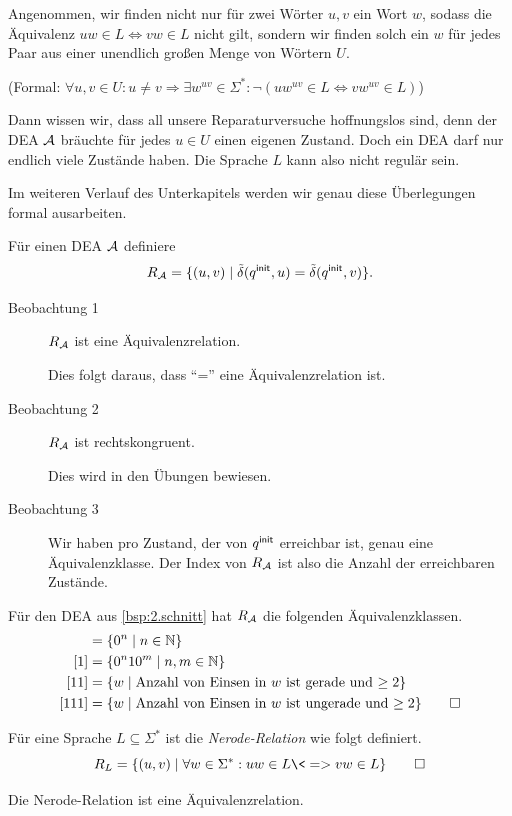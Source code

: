 Angenommen, wir finden nicht nur für zwei Wörter $u,v$ ein Wort $w$, sodass die Äquivalenz $uw\in L \Leftrightarrow vw\in L$ nicht gilt,
sondern wir finden solch ein $w$ für jedes Paar aus einer unendlich großen Menge von Wörtern $U$.
\begin{center}
(Formal: $\forall u,v\in U: u\neq v \Rightarrow \exists w^{uv}\in\Sigma^*: \neg(uw^{uv}\in L \Leftrightarrow vw^{uv}\in L)$) 
\end{center}
Dann wissen wir, dass all unsere Reparaturversuche hoffnungslos sind,
denn der \ac{DEA} $\mathcal{A}$ bräuchte für jedes $u\in U$ einen eigenen Zustand.
Doch ein \ac{DEA} darf nur endlich viele Zustände haben.
Die Sprache $L$ kann also nicht regulär sein.

Im weiteren Verlauf des Unterkapitels werden wir genau diese Überlegungen formal ausarbeiten.


\begin{Def} %
  \label{Bsp:R_m}
        Für einen \ac{DEA} $\mathcal{A}$ definiere
        \[ R_{\mathcal{A}} = \{(u,v) \mid \tilde\delta(q^\mathsf{init},u)=\tilde\delta(q^\mathsf{init},v)\}. \]
        \begin{description}
                \item[Beobachtung 1] $R_{\mathcal{A}}$ ist eine Äquivalenzrelation.
                
                Dies folgt daraus, dass "`="' eine Äquivalenzrelation ist.
                \item[Beobachtung 2] $R_{\mathcal{A}}$ ist rechtskongruent. 
                
                Dies wird in den Übungen bewiesen.
                \item[Beobachtung 3] Wir haben pro Zustand, der von $q^\mathsf{init}$ erreichbar ist, genau eine Äquivalenzklasse.
                Der Index von $R_{\mathcal{A}}$ ist also die Anzahl der erreichbaren Zustände.
        \end{description}
        
        \medskip
        
        Für den \ac{DEA} aus \autoref{bsp:2.schnitt} hat $R_{\mathcal{A}}$ die folgenden Äquivalenzklassen.
        \begin{align*}
        [\Eps] &= \{0^n\mid n\in \N\}\\
        [1] &= \{0^n10^m\mid n,m\in \N\}\\
        [11] &= \{w\mid \text{Anzahl von Einsen in $w$ ist gerade und $\geq 2$}\}\\
        [111] &= \{w\mid \text{Anzahl von Einsen in $w$ ist ungerade und $\geq 2$}\}
        \qedhere
        \end{align*}
\end{Def}
\begin{Def}
        Für eine Sprache $L\subseteq \Sigma^*$ ist die \emph{Nerode-Relation} wie folgt definiert.
        \[
        R_L = \{(u,v) \mid \forall w\in\Sigma^*: uw\in L \<=> vw\in L \}
        \qedhere
        \]
\end{Def}
\begin{lemma}
   Die Nerode-Relation ist eine Äquivalenzrelation.
\end{lemma}
 
